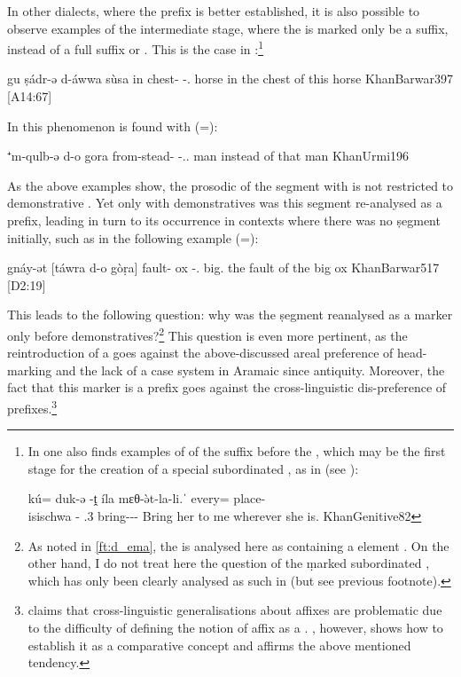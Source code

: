 In other dialects, where the  \gen* prefix is better established, it is also possible to observe examples of the intermediate stage, where the \prim is marked only be a  suffix, instead of a full \ed suffix or . This is the case in \Barw:\footnote{In \Barw one also finds  examples of  of the \cst* suffix before the , which may be the first stage for the creation of a special subordinated , as in \JZax (see ): 

{kú= duk-ə -ṱ\cb{} íla mɛθ-ə̀t-la-li.ˈ}
{every= place-\\isi{schwa}{} -\cst\cb{} \cop.3\fem{} bring-\masc-\fem-\sg}
{Bring her to me wherever she is.}
{KhanGenitive}{82} 

}

{gu\cb{} ṣádr-ə d-áwwa sùsa}
{in\cb{} chest-\cst{} \gen-\dem.\masc{} horse}
{in the chest of this horse}
{KhanBarwar}{397 {[A14:67]}}

In \JUrm this phenomenon is found with  \prims (=): 

{⁺m-qulb-ə d-o gora}
{from-stead-\cst{} \gen-\dem.\far.\sg{} man}
{instead of that man}
{KhanUrmi}{196}





As the above \Qar examples show, the prosodic  of the  segment with \secns is not restricted to demonstrative \secns. Yet  only with demonstratives was this segment re-analysed as a \gen* prefix, leading in turn to its  occurrence in contexts where there was no \d segment initially, such as  in the following example (=):

{gnáy-ət [táwra d-o\cb{} gòṛa]}
{fault-\cst{} \hspace{0.7ex}ox \gen-.\masc\cb{} big.\masc}
{the fault of the big ox}
{KhanBarwar}{517 {[D2:19]}}




 This leads to the following question: why was the \d segment reanalysed as a \gen* marker only before demonstratives?\footnote{As noted in \vref{ft:d_ema}, the   is analysed here as containing a \dem* element . On the other hand, I do not treat here the question of the \d marked subordinated , which has only been clearly analysed as such in \JZax (but see previous footnote).} This question is even more pertinent, as the reintroduction of a \gen* {} goes against the above-discussed areal preference of head-marking and the lack of a case system in Aramaic since antiquity. Moreover, the fact that this marker is a prefix goes against the cross-linguistic dis-preference of prefixes.\footnote{\citet{HaspelmathWord} claims that cross-linguistic generalisations about affixes are problematic due to the difficulty of defining the notion of affix as a . \citet{DryerAffix}, however, shows how to establish it as a comparative concept and affirms the above mentioned tendency.}


